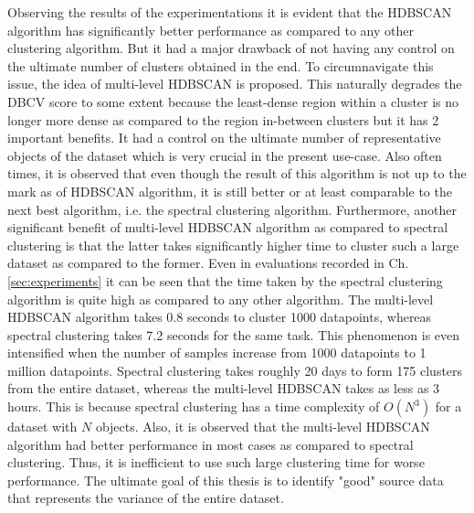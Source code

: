 Observing the results of the experimentations it is evident that the \ac{HDBSCAN} algorithm has significantly better performance as compared to any other clustering algorithm. But it had a major drawback of not having any control on the ultimate number of clusters obtained in the end. To circumnavigate this issue, the idea of multi-level \ac{HDBSCAN} is proposed. This naturally degrades the \ac{DBCV} score to some extent because the least-dense region within a cluster is no longer more dense as compared to the region in-between clusters but it has 2 important benefits. It had a control on the ultimate number of representative objects of the dataset which is very crucial in the present use-case. Also often times, it is observed that even though the result of this algorithm is not up to the mark as of \ac{HDBSCAN} algorithm, it is still better or at  least comparable to the next best algorithm, i.e. the spectral clustering algorithm. Furthermore, another significant benefit of multi-level \ac{HDBSCAN} algorithm as compared to spectral clustering is that the latter takes significantly higher time to cluster such a large dataset as compared to the former. Even in evaluations recorded in Ch. \ref{sec:experiments} it can be seen that the time taken by the spectral clustering algorithm is quite high as compared to any other algorithm. The multi-level \ac{HDBSCAN} algorithm takes 0.8 seconds to cluster 1000 datapoints, whereas spectral clustering takes 7.2 seconds for the same task. This phenomenon is even intensified when the number of samples increase from 1000 datapoints to 1 million datapoints. Spectral clustering takes roughly 20 days to form 175 clusters from the entire dataset, whereas the multi-level \ac{HDBSCAN} takes as less as 3 hours. This is because spectral clustering has a time complexity of $O(N^3)$ for a dataset with $N$ objects. Also, it is observed that the multi-level \ac{HDBSCAN} algorithm had better performance in most cases as compared to spectral clustering. Thus, it is inefficient to use such large clustering time for worse performance. The ultimate goal of this thesis is to identify "good" source data that represents the variance of the entire dataset.

